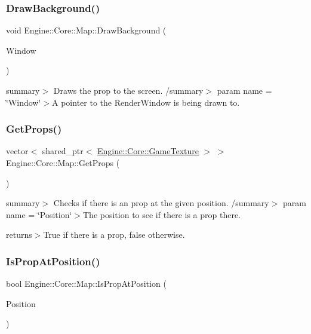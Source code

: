 \subsubsection{\texorpdfstring{Draw\+Background()}{DrawBackground()}}
{\footnotesize\ttfamily void Engine\+::\+Core\+::\+Map\+::\+Draw\+Background (\begin{DoxyParamCaption}\item[{Render\+Window $\ast$}]{Window }\end{DoxyParamCaption})}

summary$>$ Draws the prop to the screen. /summary$>$ param name = \char`\"{}\+Window\char`\"{}$>$A pointer to the Render\+Window is being drawn to.\mbox{\label{class_engine_1_1_core_1_1_map_afafd62cdfe87b27796d0900e76aa09ea}} 
\subsubsection{\texorpdfstring{Get\+Props()}{GetProps()}}
{\footnotesize\ttfamily vector$<$ shared\+\_\+ptr$<$ \hyperlink{class_engine_1_1_core_1_1_game_texture}{Engine\+::\+Core\+::\+Game\+Texture} $>$ $>$ Engine\+::\+Core\+::\+Map\+::\+Get\+Props (\begin{DoxyParamCaption}\item[{void}]{ }\end{DoxyParamCaption})}

summary$>$ Checks if there is an prop at the given position. /summary$>$ param name = \char`\"{}\+Position\char`\"{}$>$The position to see if there is a prop there.

returns$>$True if there is a prop, false otherwise.\mbox{\label{class_engine_1_1_core_1_1_map_a5d17ba161757b4b971dba919e7e0b1c1}} 
\subsubsection{\texorpdfstring{Is\+Prop\+At\+Position()}{IsPropAtPosition()}}
{\footnotesize\ttfamily bool Engine\+::\+Core\+::\+Map\+::\+Is\+Prop\+At\+Position (\begin{DoxyParamCaption}\item[{Vector2f}]{Position }\end{DoxyParamCaption})}

